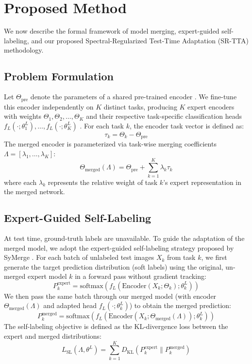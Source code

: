 \documentclass{article}
\theoremstyle{plain}
\theoremstyle{definition}
\theoremstyle{remark}
\begin{document}
\section{Proposed Method}
\label{sec:method}
We now describe the formal framework of model merging, expert-guided self-labeling, and our proposed Spectral-Regularized Test-Time Adaptation (SR-TTA) methodology.

\subsection{Problem Formulation}
\label{subsec:formulation}
Let $\Theta_{\text{pre}}$ denote the parameters of a shared pre-trained encoder \cite{he2016deep,deng2009imagenet}. We fine-tune this encoder independently on $K$ distinct tasks, producing $K$ expert encoders with weights $\Theta_1, \Theta_2, \dots, \Theta_K$ and their respective task-specific classification heads $f_L(\cdot; \theta^L_1), \dots, f_L(\cdot; \theta^L_K)$ \cite{kaiming2015delving}. For each task $k$, the encoder task vector is defined as:
\begin{equation}
  \tau_k = \Theta_k - \Theta_{\text{pre}}
\end{equation}
The merged encoder is parameterized via task-wise merging coefficients $\Lambda = [\lambda_1, \dots, \lambda_K]$:
\begin{equation}
  \Theta_{\text{merged}}(\Lambda) = \Theta_{\text{pre}} + \sum_{k=1}^K \lambda_k \tau_k
\end{equation}
where each $\lambda_k$ represents the relative weight of task $k$'s expert representation in the merged network.

\subsection{Expert-Guided Self-Labeling}
\label{subsec:self_labeling}
At test time, ground-truth labels are unavailable. To guide the adaptation of the merged model, we adopt the expert-guided self-labeling strategy proposed by SyMerge \cite{jung2025symerge}. For each batch of unlabeled test images $X_k$ from task $k$, we first generate the target prediction distribution (soft labels) using the original, un-merged expert model $k$ in a forward pass without gradient tracking:
\begin{equation}
  P^{\text{expert}}_k = \text{softmax}(f_L(\text{Encoder}(X_k; \Theta_k); \theta^L_k))
\end{equation}
We then pass the same batch through our merged model (with encoder $\Theta_{\text{merged}}(\Lambda)$ and adapted head $f_L(\cdot; \theta^L_k)$) to obtain the merged prediction:
\begin{equation}
  P^{\text{merged}}_k = \text{softmax}(f_L(\text{Encoder}(X_k; \Theta_{\text{merged}}(\Lambda)); \theta^L_k))
\end{equation}
The self-labeling objective is defined as the KL-divergence loss between the expert and merged distributions:
\begin{equation}
  L_{\text{SL}}(\Lambda, \theta^L) = \sum_{k=1}^K D_{\text{KL}}\left(P^{\text{expert}}_k \parallel P^{\text{merged}}_k\right)
\end{equation}
\end{document}
